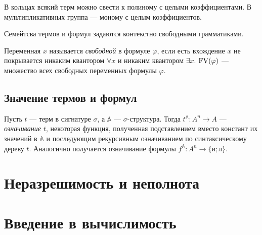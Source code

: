 \documentclass[a4paper,11pt]{article}
\begin{document}
\begin{exmpl}
	В кольцах всякий терм можно свести к полиному с целыми коэффициентами. В мультипликативных группа --- моному с целым коэффициентов.
\end{exmpl}

\begin{task}
	Семейтсва термов и формул задаются контекстно свободными грамматиками.
\end{task}

\begin{definition}
	Переменная $x$ называется \emph{свободной} в формуле $\varphi$, если есть вхождение $x$ не покрывается никаким квантором $\forall x$ и никаким квантором $\exists x$. $\operatorname{FV}(\varphi)$ --- множество всех свободных переменных формулы $\varphi$.
\end{definition}

\subsection{Значение термов и формул}

\begin{definition}
	Пусть $t$ --- терм в сигнатуре $\sigma$, а $\mathbb{A}$ --- $\sigma$-структура. Тогда $t^{\mathbb{A}}: A^n \to A$ --- \emph{означивание $t$}, некоторая функция, полученная подставлением вместо констант их значений в $\mathbb{A}$ и последующим рекурсивным означиванием по синтаксическому дереву $t$. Аналогично получается означивание формулы $f^{\mathbb{A}}: A^n \to \{\text{и}; \text{л}\}$.
\end{definition}

\section{Неразрешимость и неполнота}

\section{Введение в вычислимость}

\end{document}
